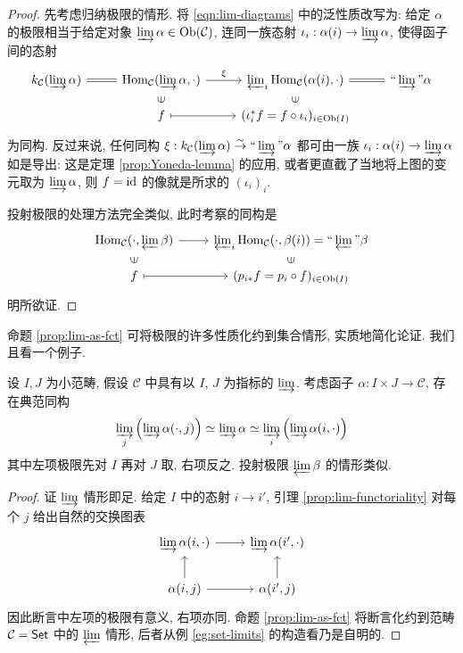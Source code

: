 \begin{proof}
	先考虑归纳极限的情形. 将 \eqref{eqn:lim-diagrams} 中的泛性质改写为: 给定 $\alpha$ 的极限相当于给定对象 $\varinjlim \alpha \in \operatorname{Ob}(\mathcal{C})$, 连同一族态射 $\iota_i: \alpha(i) \to \varinjlim \alpha$, 使得函子间的态射
	\begin{equation*}\begin{tikzcd}[row sep=small]
		k_{\mathcal{C}}(\varinjlim \alpha) \arrow[equal, r] & \Hom_{\mathcal{C}}(\varinjlim \alpha , \cdot) \arrow[r, "\xi"] & \varprojlim_i \Hom_{\mathcal{C}}(\alpha(i), \cdot) & \Yinjlim \alpha \arrow[equal, l] \\
		& f \arrow[phantom, u, sloped, "\in" description] \arrow[mapsto, r] & (\iota_i^* f = f \circ \iota_i)_{i \in \Obj(I)} \arrow[phantom, u, sloped, "\in" description] &
	\end{tikzcd}\end{equation*}
	为同构. 反过来说, 任何同构 $\xi: k_{\mathcal{C}}(\varinjlim \alpha) \rightiso \Yinjlim \alpha$ 都可由一族 $\iota_i: \alpha(i) \to \varinjlim \alpha$ 如是导出: 这是定理 \ref{prop:Yoneda-lemma} 的应用, 或者更直截了当地将上图的变元取为 $\varinjlim \alpha$, 则 $f = \mathrm{id}$ 的像就是所求的 $(\iota_i)_i$.

	投射极限的处理方法完全类似, 此时考察的同构是
	\begin{equation*}\begin{tikzcd}[row sep=small]
		\Hom_{\mathcal{C}}(\cdot, \varprojlim \beta) \arrow[r] & \varprojlim_i \Hom_{\mathcal{C}}(\cdot, \beta(i)) = \Yprojlim \beta \\
		f \arrow[phantom, u, sloped, "\in" description] \arrow[mapsto, r] & (p_{i *} f = p_i \circ f)_{i \in \Obj(I)} \arrow[phantom, u, sloped, "\in" description]
	\end{tikzcd}\end{equation*}
	明所欲证.
\end{proof}

命题 \ref{prop:lim-as-fct} 可将极限的许多性质化约到集合情形, 实质地简化论证. 我们且看一个例子.
\begin{lemma}\label{prop:lim-Fubini}
	设 $I, J$ 为小范畴, 假设 $\mathcal{C}$ 中具有以 $I$, $J$ 为指标的 $\varinjlim$. 考虑函子 $\alpha: I \times J \to \mathcal{C}$, 存在典范同构
	\[ \varinjlim_j \left( \varinjlim\alpha(\cdot, j) \right) \simeq \varinjlim \alpha \simeq \varinjlim_i \left( \varinjlim\alpha(i, \cdot) \right) \]
	其中左项极限先对 $I$ 再对 $J$ 取, 右项反之. 投射极限 $\varprojlim \beta$ 的情形类似.
\end{lemma}
\begin{proof}
	证 $\varinjlim$ 情形即足. 给定 $I$ 中的态射 $i \to i'$, 引理 \ref{prop:lim-functoriality} 对每个 $j$ 给出自然的交换图表
	\[ \begin{tikzcd}
		\varinjlim \alpha(i, \cdot) \arrow[r] & \varinjlim \alpha(i', \cdot) \\
		\alpha(i, j) \arrow[r] \arrow[u] & \alpha(i', j) \arrow[u]
	\end{tikzcd} \]
	因此断言中左项的极限有意义, 右项亦同. 命题 \ref{prop:lim-as-fct} 将断言化约到范畴 $\mathcal{C} = \mathsf{Set}$ 中的 $\varprojlim$ 情形, 后者从例 \ref{eg:set-limits} 的构造看乃是自明的.
\end{proof}

